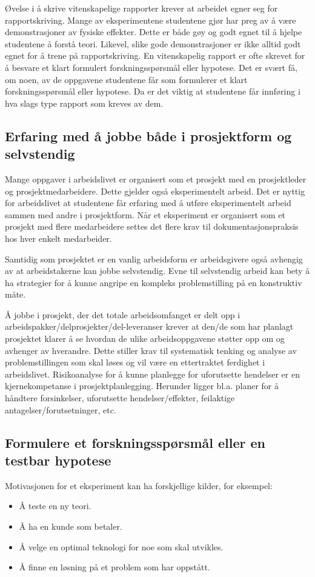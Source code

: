 \documentclass{article}
\begin{document}
Øvelse i å skrive vitenskapelige rapporter krever at arbeidet egner seg for rapportskriving. Mange av eksperimentene studentene gjør har preg av å være demonstrasjoner av fysiske effekter. Dette er både gøy og godt egnet til å hjelpe studentene å forstå teori. Likevel, slike gode demonstrasjoner er ikke alltid godt egnet for å trene på rapportskriving. En vitenskapelig rapport er ofte skrevet for å besvare et klart formulert forskningsspørsmål eller hypotese. Det er svært få, om noen, av de oppgavene studentene får som formulerer et klart forskningsspørsmål eller hypotese. Da er det viktig at studentene får innføring i hva slags type rapport som kreves av dem.

\subsection{Erfaring med å jobbe både i prosjektform og selvstendig}
Mange oppgaver i arbeidslivet er organisert som et prosjekt med en prosjektleder og prosjektmedarbeidere.
Dette gjelder også eksperimentelt arbeid.
Det er nyttig for arbeidslivet at studentene får erfaring med å utføre eksperimentelt arbeid sammen med andre i prosjektform.
Når et eksperiment er organisert som et prosjekt med flere medarbeidere settes det flere krav til dokumentasjonspraksis hos hver enkelt medarbeider.

Samtidig som prosjektet er en vanlig arbeidsform er arbeidsgivere også avhengig av at arbeidstakerne kan jobbe selvstendig.
Evne til selvstendig arbeid kan bety å ha strategier for å kunne angripe en kompleks problemstilling på en konstruktiv måte.

Å jobbe i prosjekt, der det totale arbeidsomfanget er delt opp i arbeidspakker/delprosjekter/del-leveranser krever at den/de som har planlagt prosjektet klarer å se hvordan de ulike arbeidsoppgavene støtter opp om og avhenger av hverandre.
Dette stiller krav til systematisk tenking og analyse av problemstillingen som skal løses og vil være en ettertraktet ferdighet i arbeidslivet.
Risikoanalyse for å kunne planlegge for uforutsette hendelser er en kjernekompetanse i prosjektplanlegging.
Herunder ligger bl.a. planer for å håndtere forsinkelser, uforutsette hendelser/effekter, feilaktige antagelser/forutsetninger, etc.

\subsection{Formulere et forskningsspørsmål eller en testbar hypotese}
Motivasjonen for et eksperiment kan ha forskjellige kilder, for eksempel:
\begin{itemize}
  \item Å teste en ny teori.
  \item Å ha en kunde som betaler.
  \item Å velge en optimal teknologi for noe som skal utvikles.
  \item Å finne en løsning på et problem som har oppstått.
\end{itemize}
\end{document}
